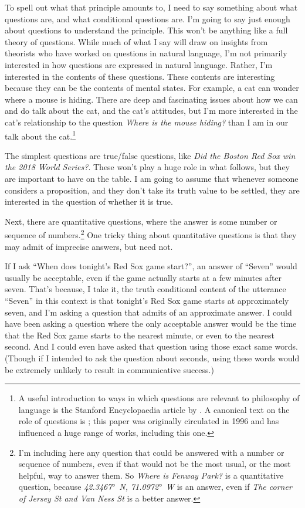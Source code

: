 \documentclass[11pt,]{book}
\let\rmarkdownfootnote\footnote%
\def\footnote{\protect\rmarkdownfootnote}
\begin{document}
To spell out what that principle amounts to, I need to say something about what questions are, and what conditional questions are. I'm going to say just enough about questions to understand the principle. This won't be anything like a full theory of questions. While much of what I say will draw on insights from theorists who have worked on questions in natural language, I'm not primarily interested in how questions are expressed in natural language. Rather, I'm interested in the contents of these questions. These contents are interesting because they can be the contents of mental states. For example, a cat can wonder where a mouse is hiding. There are deep and fascinating issues about how we can and do talk about the cat, and the cat's attitudes, but I'm more interested in the cat's relationship to the question \emph{Where is the mouse hiding?} than I am in our talk about the cat.\footnote{A useful introduction to ways in which questions are relevant to philosophy of language is the Stanford Encyclopaedia article by \citet{sep-questions}. A canonical text on the role of questions is \citet{Roberts2012}; this paper was originally circulated in 1996 and has influenced a huge range of works, including this one.}

The simplest questions are true/false questions, like \emph{Did the Boston Red Sox win the 2018 World Series?}. These won't play a huge role in what follows, but they are important to have on the table. I am going to assume that whenever someone considers a proposition, and they don't take its truth value to be settled, they are interested in the question of whether it is true.

Next, there are quantitative questions, where the answer is some number or sequence of numbers.\footnote{I'm including here any question that could be answered with a number or sequence of numbers, even if that would not be the most usual, or the most helpful, way to answer them. So \emph{Where is Fenway Park?} is a quantitative question, because \emph{42.3467\(\degree\) N, 71.0972\(\degree\) W} is an answer, even if \emph{The corner of Jersey St and Van Ness St} is a better answer.} One tricky thing about quantitative questions is that they may admit of imprecise answers, but need not.

If I ask ``When does tonight's Red Sox game start?'', an answer of ``Seven'' would usually be acceptable, even if the game actually starts at a few minutes after seven. That's because, I take it, the truth conditional content of the utterance ``Seven'' in this context is that tonight's Red Sox game starts at approximately seven, and I'm asking a question that admits of an approximate answer. I could have been asking a question where the only acceptable answer would be the time that the Red Sox game starts to the nearest minute, or even to the nearest second. And I could even have asked that question using those exact same words. (Though if I intended to ask the question about seconds, using these words would be extremely unlikely to result in communicative success.)
\end{document}
